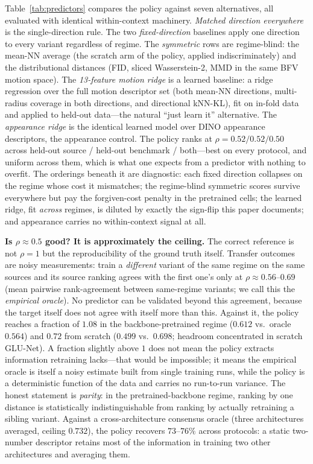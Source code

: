 \documentclass[runningheads]{llncs}
\begin{document}
Table~\ref{tab:predictors} compares the policy against seven alternatives,
all evaluated with identical within-context machinery. \emph{Matched
direction everywhere} is the single-direction rule. The two
\emph{fixed-direction} baselines apply one direction to every variant
regardless of regime. The \emph{symmetric} rows are regime-blind: the
mean-NN average (the scratch arm of the policy, applied indiscriminately)
and the distributional distances (FID, sliced Wasserstein-2, MMD in the same
BFV motion space). The \emph{13-feature motion ridge} is a learned baseline:
a ridge regression over the full motion descriptor set (both mean-NN
directions, multi-radius coverage in both directions, and directional
kNN-KL), fit on in-fold data and applied to held-out data---the natural
``just learn it'' alternative. The \emph{appearance ridge} is the identical
learned model over DINO appearance descriptors, the appearance control. The
policy ranks at $\rho = 0.52/0.52/0.50$ across held-out source / held-out
benchmark / both---best on every protocol, and uniform across them, which is
what one expects from a predictor with nothing to overfit. The orderings
beneath it are diagnostic: each fixed direction collapses on the regime
whose cost it mismatches; the regime-blind symmetric scores survive
everywhere but pay the forgiven-cost penalty in the pretrained cells; the
learned ridge, fit \emph{across} regimes, is diluted by exactly the
sign-flip this paper documents; and appearance carries no within-context
signal at all.

\noindent\textbf{Is $\rho\approx0.5$ good? It is approximately the ceiling.}
The correct reference is not $\rho{=}1$ but the reproducibility of the ground
truth itself. Transfer outcomes are noisy measurements: train a
\emph{different} variant of the same regime on the same sources and its
source ranking agrees with the first one's only at $\rho \approx
0.56$--$0.69$ (mean pairwise rank-agreement between same-regime variants; we
call this the \emph{empirical oracle}). No predictor can be validated beyond
this agreement, because the target itself does not agree with itself more
than this. Against it, the policy reaches a fraction of $1.08$ in the
backbone-pretrained regime ($0.612$ vs.\ oracle $0.564$) and $0.72$ from
scratch ($0.499$ vs.\ $0.698$; headroom concentrated in scratch GLU-Net). A
fraction slightly above $1$ does not mean the policy extracts information
retraining lacks---that would be impossible; it means the empirical oracle is
itself a noisy estimate built from single training runs, while the policy is
a deterministic function of the data and carries no run-to-run variance. The
honest statement is \emph{parity}: in the pretrained-backbone regime,
ranking by one distance is statistically indistinguishable from ranking by
actually retraining a sibling variant. Against a cross-architecture consensus
oracle (three architectures averaged, ceiling $0.732$), the policy recovers
$73$--$76\%$ across protocols: a static two-number descriptor retains most
of the information in training two other architectures and averaging
them.
\end{document}
